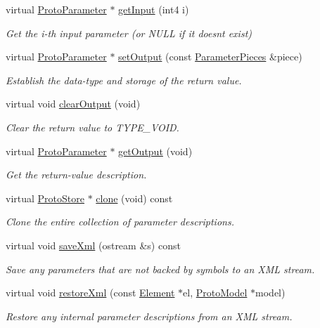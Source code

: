 \begin{DoxyCompactItemize}
virtual \mbox{\hyperlink{class_proto_parameter}{Proto\+Parameter}} $\ast$ \mbox{\hyperlink{class_proto_store_internal_ab637f859e1c4553e24d4651836ce7c84}{get\+Input}} (int4 i)
\begin{DoxyCompactList}\small\item\em Get the i-\/th input parameter (or N\+U\+LL if it doesn\textquotesingle{}t exist) \end{DoxyCompactList}\item 
virtual \mbox{\hyperlink{class_proto_parameter}{Proto\+Parameter}} $\ast$ \mbox{\hyperlink{class_proto_store_internal_a9dfb7feca9c49b33e9857740e7ea9a9a}{set\+Output}} (const \mbox{\hyperlink{struct_parameter_pieces}{Parameter\+Pieces}} \&piece)
\begin{DoxyCompactList}\small\item\em Establish the data-\/type and storage of the return value. \end{DoxyCompactList}\item 
virtual void \mbox{\hyperlink{class_proto_store_internal_a8d17ecfc29c19b63b9d462462887017f}{clear\+Output}} (void)
\begin{DoxyCompactList}\small\item\em Clear the return value to T\+Y\+P\+E\+\_\+\+V\+O\+ID. \end{DoxyCompactList}\item 
virtual \mbox{\hyperlink{class_proto_parameter}{Proto\+Parameter}} $\ast$ \mbox{\hyperlink{class_proto_store_internal_a01b4100ec95fcd835b7f8ae6cad8f796}{get\+Output}} (void)
\begin{DoxyCompactList}\small\item\em Get the return-\/value description. \end{DoxyCompactList}\item 
virtual \mbox{\hyperlink{class_proto_store}{Proto\+Store}} $\ast$ \mbox{\hyperlink{class_proto_store_internal_ac14aea73b6e7381a6751a1bcf98c1930}{clone}} (void) const
\begin{DoxyCompactList}\small\item\em Clone the entire collection of parameter descriptions. \end{DoxyCompactList}\item 
virtual void \mbox{\hyperlink{class_proto_store_internal_a1ad86117b6c4aaace47788adaef58880}{save\+Xml}} (ostream \&s) const
\begin{DoxyCompactList}\small\item\em Save any parameters that are not backed by symbols to an X\+ML stream. \end{DoxyCompactList}\item 
virtual void \mbox{\hyperlink{class_proto_store_internal_ae1c3cd409eda277f1ff924cf858eddef}{restore\+Xml}} (const \mbox{\hyperlink{class_element}{Element}} $\ast$el, \mbox{\hyperlink{class_proto_model}{Proto\+Model}} $\ast$model)
\begin{DoxyCompactList}\small\item\em Restore any internal parameter descriptions from an X\+ML stream. \end{DoxyCompactList}\end{DoxyCompactItemize}


